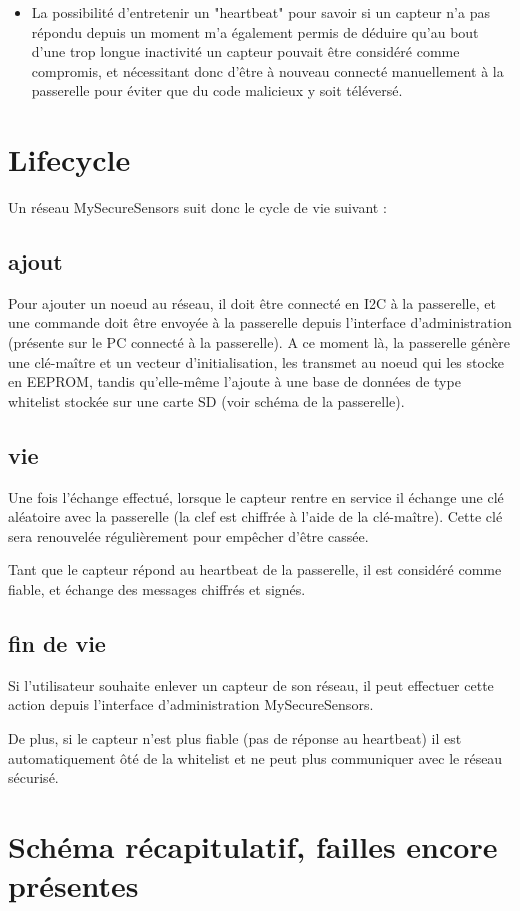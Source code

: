 \documentclass[12 pt]{report}
\begin{document}
\begin{appendix}
\begin{itemize}
\item La possibilité d'entretenir un "heartbeat" pour savoir si un capteur n'a pas répondu depuis un moment m'a également permis de déduire qu'au bout d'une trop longue inactivité un capteur pouvait être considéré comme compromis, et nécessitant donc d'être à nouveau connecté manuellement à la passerelle pour éviter que du code malicieux y soit téléversé.
\end{itemize}

\section{Lifecycle}
Un réseau MySecureSensors suit donc le cycle de vie suivant :
\subsection{ajout}
Pour ajouter un noeud au réseau, il doit être connecté en I2C à la passerelle, et une commande doit être envoyée à la passerelle depuis l'interface d'administration (présente sur le PC connecté à la passerelle). A ce moment là, la passerelle génère une clé-maître et un vecteur d'initialisation, les transmet au noeud qui les stocke en EEPROM, tandis qu'elle-même l'ajoute à une base de données de type whitelist stockée sur une carte SD (voir schéma de la passerelle).
\subsection{vie}
Une fois l'échange effectué, lorsque le capteur rentre en service il échange une clé aléatoire avec la passerelle (la clef est chiffrée à l'aide de la clé-maître). Cette clé sera renouvelée régulièrement pour empêcher d'être cassée.

Tant que le capteur répond au heartbeat de la passerelle, il est considéré comme fiable, et échange des messages chiffrés et signés.

\subsection{fin de vie}
Si l'utilisateur souhaite enlever un capteur de son réseau, il peut effectuer cette action depuis l'interface d'administration MySecureSensors.

De plus, si le capteur n'est plus fiable (pas de réponse au heartbeat) il est automatiquement ôté de la whitelist et ne peut plus communiquer avec le réseau sécurisé.

\section{Schéma récapitulatif, failles encore présentes}

\end{appendix}
\end{document}
